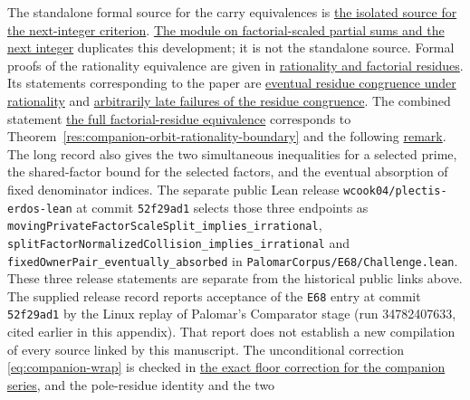 \documentclass[11pt]{article}
\begin{document}
The standalone formal source for the carry equivalences is
\href{https://github.com/wcook04/plectis-erdos/blob/f36a98bf3d3e6f65f1074e3b800e3293d5b8a51a/ErdosProblems/Erdos68/FactorialGapPlateauCore.lean}{the isolated source for the next-integer criterion}.
\href{https://github.com/wcook04/plectis-erdos/blob/f36a98bf3d3e6f65f1074e3b800e3293d5b8a51a/ErdosProblems/Erdos68/FactorialZeroPlateau.lean}{The module on factorial-scaled partial sums and the next integer} duplicates this development; it is not the standalone source.
Formal proofs of the rationality equivalence are given in
\href{https://github.com/wcook04/plectis-erdos/blob/f36a98bf3d3e6f65f1074e3b800e3293d5b8a51a/ErdosProblems/Erdos68/CompanionOrbitRationality.lean}{rationality and factorial residues}.  Its statements corresponding to the paper are
\href{https://github.com/wcook04/plectis-erdos/blob/f36a98bf3d3e6f65f1074e3b800e3293d5b8a51a/ErdosProblems/Erdos68/CompanionOrbitRationality.lean}{eventual residue congruence under rationality}
and
\href{https://github.com/wcook04/plectis-erdos/blob/f36a98bf3d3e6f65f1074e3b800e3293d5b8a51a/ErdosProblems/Erdos68/CompanionOrbitRationality.lean}{arbitrarily late failures of the residue congruence}.
The combined statement
\href{https://github.com/wcook04/plectis-erdos/blob/f36a98bf3d3e6f65f1074e3b800e3293d5b8a51a/ErdosProblems/Erdos68/CompanionOrbitRationality.lean}{the full factorial-residue equivalence} corresponds to
Theorem~\ref{res:companion-orbit-rationality-boundary} and
the following \hyperref[bdry:companion-orbit-nonconcentration]{remark}.  The long record also gives the two simultaneous inequalities for a selected
prime, the shared-factor bound for the selected factors, and the eventual
absorption of fixed denominator indices. The separate public Lean release
\nolinkurl{wcook04/plectis-erdos-lean} at commit \texttt{52f29ad1} selects those
three endpoints as
\texttt{movingPrivateFactorScaleSplit\_implies\_irrational},
\texttt{splitFactorNormalizedCollision\_implies\_irrational} and
\texttt{fixedOwnerPair\_eventually\_absorbed} in
\texttt{PalomarCorpus/E68/Challenge.lean}.  These three release statements are separate from the historical public
links above. The supplied release record reports acceptance of the
\texttt{E68} entry at commit \texttt{52f29ad1} by the Linux replay of
Palomar's Comparator stage (run 34782407633, cited earlier in this appendix).
That report does not establish a new compilation of every source linked
by this manuscript.
The unconditional correction \eqref{eq:companion-wrap} is checked in
\href{https://github.com/wcook04/plectis-erdos/blob/f36a98bf3d3e6f65f1074e3b800e3293d5b8a51a/ErdosProblems/Erdos68/CompanionConstantCarryLaw.lean}{the exact floor correction for the companion series}, and the pole-residue identity and the two
\end{document}
